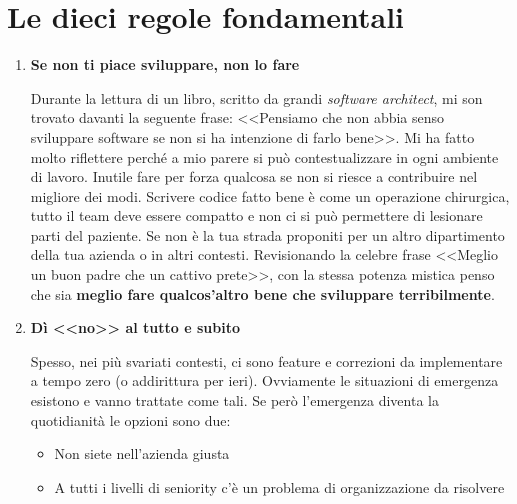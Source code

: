 \section{Le dieci regole fondamentali}



\begin{enumerate}

\item \textbf{Se non ti piace sviluppare, non lo fare}

Durante la lettura di un libro, scritto da grandi \emph{software architect}, mi son trovato davanti la seguente frase: <<Pensiamo che non abbia senso sviluppare software se non si ha intenzione di farlo bene>>. Mi ha fatto molto riflettere perché a mio parere si può contestualizzare in ogni ambiente di lavoro. Inutile fare per forza qualcosa se non si riesce a contribuire nel migliore dei modi. Scrivere codice fatto bene è come un operazione chirurgica, tutto il team deve essere compatto e non ci si può permettere di lesionare parti del paziente. Se non è la tua strada proponiti per un altro dipartimento della tua azienda o in altri contesti. Revisionando la celebre frase <<Meglio un buon padre che un cattivo prete>>, con la stessa potenza mistica penso che sia \textbf{meglio fare qualcos'altro bene che sviluppare terribilmente}.

\item \textbf{Dì <<no>> al tutto e subito}

Spesso, nei più svariati contesti, ci sono feature e correzioni da implementare a tempo zero (o addirittura per ieri). Ovviamente le situazioni di emergenza esistono e vanno trattate come tali. Se però l'emergenza diventa la quotidianità le opzioni sono due:
\begin{itemize}
\item Non siete nell'azienda giusta
\item A tutti i livelli di seniority c'è un problema di organizzazione da risolvere
\end{itemize}


\end{enumerate}
